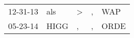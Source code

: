 \begin{supertabular}{p{0.07\textwidth}p{0.06\textwidth}p{0.02\textwidth}p{0.02\textwidth}p{0.06\textwidth}}
 12-31-13\textsuperscript{} &   als\textsuperscript{} &  \textgreater &  , &   WAP\textsuperscript{} \\
 05-23-14\textsuperscript{} &  HIGG\textsuperscript{} &             , &  , &  ORDE\textsuperscript{} \\
\end{supertabular}
